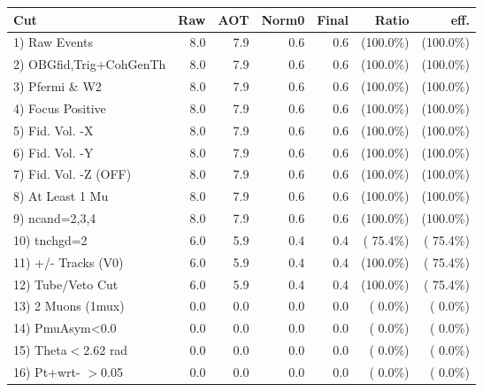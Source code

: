 \begin{table}[h!]\centering
 \begin{tabular}{||l||r|r|r|r|r|r||}
 \hline
 \hline
 Cut & Raw & AOT & Norm0 & Final & Ratio & eff.       \\
 \hline
  1) Raw Events           &          8.0 &          7.9 &          0.6 &          0.6 & (100.0\%) & (100.0\%) \\
  2) OBGfid,Trig+CohGenTh &          8.0 &          7.9 &          0.6 &          0.6 & (100.0\%) & (100.0\%) \\
  3) Pfermi \& W2         &          8.0 &          7.9 &          0.6 &          0.6 & (100.0\%) & (100.0\%) \\
  4) Focus Positive       &          8.0 &          7.9 &          0.6 &          0.6 & (100.0\%) & (100.0\%) \\
  5) Fid. Vol. -X         &          8.0 &          7.9 &          0.6 &          0.6 & (100.0\%) & (100.0\%) \\
  6) Fid. Vol. -Y         &          8.0 &          7.9 &          0.6 &          0.6 & (100.0\%) & (100.0\%) \\
  7) Fid. Vol. -Z (OFF)   &          8.0 &          7.9 &          0.6 &          0.6 & (100.0\%) & (100.0\%) \\
  8) At Least 1 Mu        &          8.0 &          7.9 &          0.6 &          0.6 & (100.0\%) & (100.0\%) \\
  9) ncand=2,3,4          &          8.0 &          7.9 &          0.6 &          0.6 & (100.0\%) & (100.0\%) \\
 10) tnchgd=2             &          6.0 &          5.9 &          0.4 &          0.4 & ( 75.4\%) & ( 75.4\%) \\
 11) +/- Tracks (V0)      &          6.0 &          5.9 &          0.4 &          0.4 & (100.0\%) & ( 75.4\%) \\
 12) Tube/Veto Cut        &          6.0 &          5.9 &          0.4 &          0.4 & (100.0\%) & ( 75.4\%) \\
 13) 2 Muons (1mux)       &          0.0 &          0.0 &          0.0 &          0.0 & (  0.0\%) & (  0.0\%) \\
 14) PmuAsym<0.0          &          0.0 &          0.0 &          0.0 &          0.0 & (  0.0\%) & (  0.0\%) \\
 15) Theta$<$2.62 rad     &          0.0 &          0.0 &          0.0 &          0.0 & (  0.0\%) & (  0.0\%) \\
 16) Pt+wrt- $>$0.05      &          0.0 &          0.0 &          0.0 &          0.0 & (  0.0\%) & (  0.0\%) \\

\end{tabular}
\end{table}
